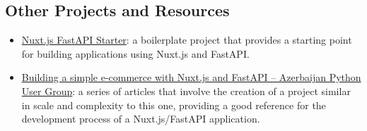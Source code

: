 \documentclass[11pt,italian,a4paper]{article}
\begin{document}
\subsection{Other Projects and Resources}
\begin{itemize}
    \item \href{https://github.com/TutorFx/nuxtjs-fastapi}{Nuxt.js FastAPI Starter}: a boilerplate project that provides a starting point for building applications using Nuxt.js and FastAPI.
    \item \href{https://www.azepug.az/posts/fastapi/#building-simple-e-commerce-with-nuxtjs-and-fastapi-series}{Building a simple e-commerce with Nuxt.js and FastAPI -- Azerbaijan Python User Group}: a series of articles that involve the creation of a project similar in scale and complexity to this one, providing a good reference for the development process of a Nuxt.js/FastAPI application.
\end{itemize}
\end{document}
